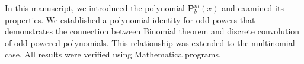 In this manuscript, we introduced the polynomial $\mathbf{P}^{m}_{b}(x)$ and examined its properties.
We established a polynomial identity for odd-powers that demonstrates the connection between Binomial theorem
and discrete convolution of odd-powered polynomials.
This relationship was extended to the multinomial case.
All results were verified using Mathematica programs.
